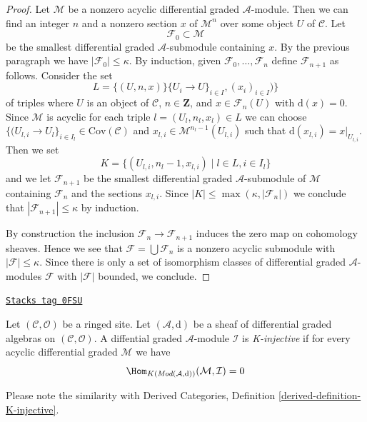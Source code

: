 \begin{proof}
\medskip\noindent
Let $\mathcal{M}$ be a nonzero acyclic differential graded
$\mathcal{A}$-module. Then we can find an integer $n$ and a
nonzero section $x$ of $\mathcal{M}^n$ over some object $U$
of $\mathcal{C}$. Let
$$
\mathcal{F}_0 \subset \mathcal{M}
$$
be the smallest differential graded $\mathcal{A}$-submodule
containing $x$. By the previous paragraph we have
$|\mathcal{F}_0| \leq \kappa$. By induction, given
$\mathcal{F}_0, \ldots, \mathcal{F}_n$ define
$\mathcal{F}_{n + 1}$ as follows. Consider the set
$$
L = \{(U, n, x)\}
\{U_i \to U\}_{i \in I}, (x_i)_{i \in I})\}
$$
of triples where $U$ is an object of $\mathcal{C}$, $n \in \mathbf{Z}$,
and $x \in \mathcal{F}_n(U)$ with $\text{d}(x) = 0$. Since
$\mathcal{M}$ is acyclic for each triple $l = (U_l, n_l, x_l) \in L$
we can choose
$\{(U_{l, i} \to U_l\}_{i \in I_l} \in \text{Cov}(\mathcal{C})$ and
$x_{l, i} \in \mathcal{M}^{n_l - 1}(U_{l, i})$ such that
$\text{d}(x_{l, i}) = x|_{U_{l, i}}$. Then we set
$$
K = \{(U_{l, i}, n_l - 1, x_{l, i}) \mid l \in L, i \in I_l\}
$$
and we let $\mathcal{F}_{n + 1}$ be the smallest differential
graded $\mathcal{A}$-submodule of $\mathcal{M}$ containing
$\mathcal{F}_n$ and the sections $x_{l, i}$.
Since $|K| \leq \max(\kappa, |\mathcal{F}_n|)$
we conclude that $|\mathcal{F}_{n + 1}| \leq \kappa$ by induction.

\medskip\noindent
By construction the inclusion $\mathcal{F}_n \to \mathcal{F}_{n + 1}$
induces the zero map on cohomology sheaves. Hence we see that
$\mathcal{F} = \bigcup \mathcal{F}_n$ is a nonzero acyclic submodule
with $|\mathcal{F}| \leq \kappa$. Since there is only a set
of isomorphism classes of differential graded $\mathcal{A}$-modules
$\mathcal{F}$ with $|\mathcal{F}|$ bounded, we conclude.
\end{proof}

\begin{definition}[K injective]
\label{sdga-definition-K-injective}
\href{https://stacks.math.columbia.edu/tag/0FSU}{\texttt{Stacks tag 0FSU}}

Let $(\mathcal{C}, \mathcal{O})$ be a ringed site.
Let $(\mathcal{A}, \text{d})$ be a sheaf of differential graded algebras
on $(\mathcal{C}, \mathcal{O})$. A diffential graded $\mathcal{A}$-module
$\mathcal{I}$ is {\it K-injective} if for every acyclic
differential graded $\mathcal{M}$ we have
$$
\Hom_{K(\textit{Mod}(\mathcal{A}, \text{d}))}(\mathcal{M}, \mathcal{I}) = 0
$$
\end{definition}

Please note the similarity with
Derived Categories, Definition \ref{derived-definition-K-injective}.

